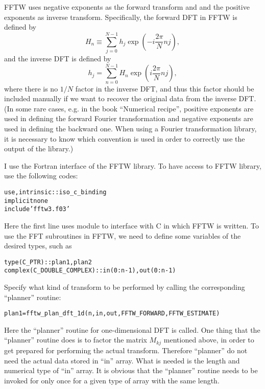 \documentclass{article}
\newcommand{\codestar}[1]{\text{{\bfseries{#1}}}}
\newenvironment{tmcode}[1][]{\begin{alltt} }{\end{alltt}}
\begin{document}
FFTW uses negative exponents as the forward transform and and the positive
exponents as inverse transform. Specifically, the forward DFT in FFTW is
defined by
\begin{equation}
  H_n \equiv \sum_{j = 0}^{N - 1} h_j \exp \left( - i \frac{2 \pi}{N} n j
  \right),
\end{equation}
and the inverse DFT is defined by
\begin{equation}
  h_j = \sum_{n = 0}^{N - 1} H_n \exp \left( i \frac{2 \pi}{N} n j \right),
\end{equation}
where there is no $1 / N$ factor in the inverse DFT, and thus this factor
should be included manually if we want to recover the original data from the
inverse DFT. (In some rare cases, e.g. in the book ``Numerical
recipe''{\cite{press1992}}, positive exponents are used in defining the
forward Fourier transformation and negative exponents are used in defining the
backward one. When using a Fourier transformation library, it is necessary to
know which convention is used in order to correctly use the output of the
library.)

I use the Fortran interface of the FFTW library. To have access to FFTW
library, use the following codes:
\begin{tmcode}
use, intrinsic :: iso_c_binding
implicit none
include 'fftw3.f03'
\end{tmcode}
Here the first line uses {\codestar{iso\_c\_binding}} module to interface with
C in which FFTW is written. To use the FFT subroutines in FFTW, we need to
define some variables of the desired types, such as
\begin{tmcode}
type(C_PTR) :: plan1, plan2
complex(C_DOUBLE_COMPLEX) :: in(0:n-1), out(0:n-1)
\end{tmcode}
Specify what kind of transform to be performed by calling the corresponding
``planner'' routine:
\begin{tmcode}
plan1 = fftw_plan_dft_1d(n, in,out, FFTW_FORWARD,FFTW_ESTIMATE)
\end{tmcode}
Here the ``planner'' routine for one-dimensional DFT is called. One thing that
the ``planner'' routine does is to factor the matrix $M_{k j}$ mentioned
above, in order to get prepared for performing the actual transform. Therefore
``planner'' do not need the actual data stored in ``in'' array. What is needed
is the length and numerical type of ``in'' array. It is obvious that the
``planner'' routine needs to be invoked for only once for a given type of
array with the same length.
\end{document}
